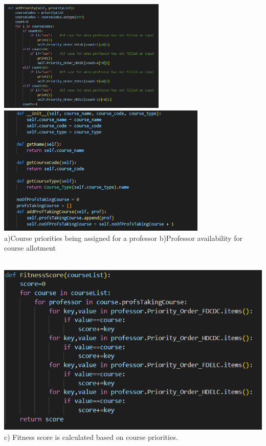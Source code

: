 \documentclass[a4paper,12pt]{article}
\begin{document}
\graphicspath{ {./images/} }
\includegraphics[width=8cm]{Professor.py1}
\includegraphics[width=10cm]{Course}\\
a)Course priorities being assigned for a professor   \hspace{1cm}       b)Professor availability for course allotment \\ \\

\graphicspath{ {./images/} }
\includegraphics[width=\textwidth]{Fitness} \\ 
 \hspace{5cm} c) Fitness score is calculated based on course priorities. \\ \\ 
\end{document}
